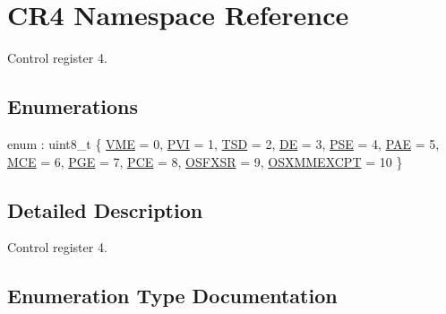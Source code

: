 \hypertarget{namespace_c_r4}{}\section{C\+R4 Namespace Reference}
\label{namespace_c_r4}


Control register 4.  


\subsection*{Enumerations}
\begin{DoxyCompactItemize}
\item 
enum \+: uint8\+\_\+t \{ \newline
\hyperlink{namespace_c_r4_aafe95739cfe1ff98b6250e2af6613758aa569bc9b3252f731550182a03c650797}{V\+ME} = 0, 
\hyperlink{namespace_c_r4_aafe95739cfe1ff98b6250e2af6613758a6b65c8f982880d05c6a32200c60242db}{P\+VI} = 1, 
\hyperlink{namespace_c_r4_aafe95739cfe1ff98b6250e2af6613758ace0ed188ba0369731b44b7df079a518b}{T\+SD} = 2, 
\hyperlink{namespace_c_r4_aafe95739cfe1ff98b6250e2af6613758a6ba0a01eeee81d3b2b4165a5084b507a}{DE} = 3, 
\newline
\hyperlink{namespace_c_r4_aafe95739cfe1ff98b6250e2af6613758af62a80eb9fee090b45e3962ca9adb6cd}{P\+SE} = 4, 
\hyperlink{namespace_c_r4_aafe95739cfe1ff98b6250e2af6613758a3a3afec51c05f51090a3d704d31ff310}{P\+AE} = 5, 
\hyperlink{namespace_c_r4_aafe95739cfe1ff98b6250e2af6613758ab6bdf44cebbecb78a845af15d91a1d0a}{M\+CE} = 6, 
\hyperlink{namespace_c_r4_aafe95739cfe1ff98b6250e2af6613758adef854f9df515146e4f5c5b7c46206ee}{P\+GE} = 7, 
\newline
\hyperlink{namespace_c_r4_aafe95739cfe1ff98b6250e2af6613758afd06ff4443c1659425fefcc65fc76419}{P\+CE} = 8, 
\hyperlink{namespace_c_r4_aafe95739cfe1ff98b6250e2af6613758ab0cf978bb5b8c32070363ab81d327c53}{O\+S\+F\+X\+SR} = 9, 
\hyperlink{namespace_c_r4_aafe95739cfe1ff98b6250e2af6613758abb68ec0930317011b84484346947f472}{O\+S\+X\+M\+M\+E\+X\+C\+PT} = 10
 \}
\end{DoxyCompactItemize}


\subsection{Detailed Description}
Control register 4. 

\subsection{Enumeration Type Documentation}
\mbox{\label{namespace_c_r4_aafe95739cfe1ff98b6250e2af6613758}} 
